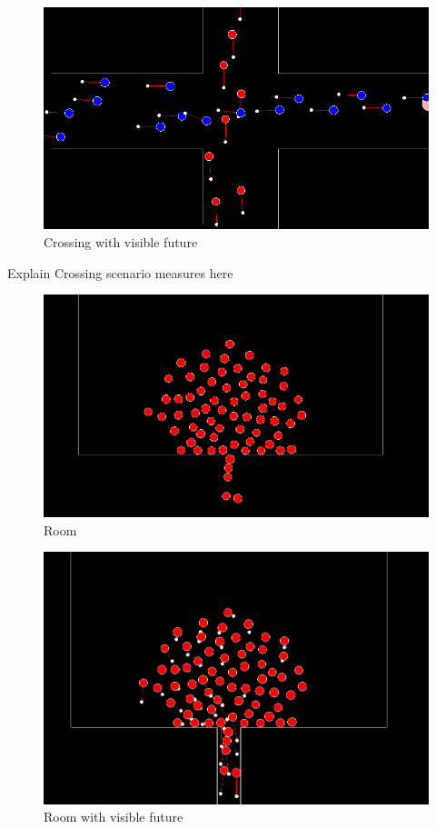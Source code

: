 \documentclass[draftclsnofoot]{IEEEtran}
\begin{document}
\begin{figure}[!ht]
    \centering
    \includegraphics[scale=0.2]{./pics/program/crossing-future}
    \caption{Crossing with visible future}
\end{figure}

Explain Crossing scenario measures here

\begin{figure}[!ht]
    \begin{centering}
    \includegraphics[scale=0.25]{./pics/program/room-no-future}
    \par\end{centering}
    \caption{Room}
\end{figure}

\begin{figure}[!ht]
    \centering
    \includegraphics[scale=0.25]{./pics/program/room-future}
    \caption{Room with visible future}
\end{figure}
\end{document}
